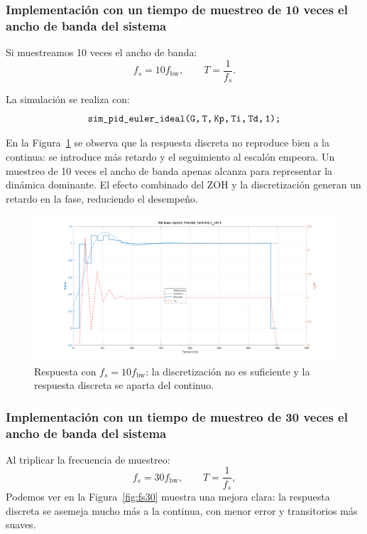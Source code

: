 \twocolumn
\subsubsection{ Implementación con un tiempo de muestreo de 10 veces el ancho de banda del sistema
}


Si muestreamos 10 veces el ancho de banda:
\[
f_s = 10 f_{\mathrm{bw}}, \qquad T = \frac{1}{f_s}.
\]

La simulación se realiza con:
\[
\texttt{sim\_pid\_euler\_ideal(G,\,T,\,Kp,\,Ti,\,Td,\,1);}
\]

En la Figura~\ref{fig:fs10} se observa que la respuesta discreta no reproduce bien a la continua: se introduce más retardo y el seguimiento al escalón empeora.
Un muestreo de 10 veces el ancho de banda apenas alcanza para representar la dinámica dominante. El efecto combinado del ZOH y la discretización generan un retardo en la fase, reduciendo el desempeño.  

\begin{figure}[!t]
	\centering
	\includegraphics[width=\columnwidth]{img/fs10.png}
	\caption{Respuesta con $f_s=10 f_{\mathrm{bw}}$: la discretización no es suficiente y la respuesta discreta se aparta del continuo.}
	\label{fig:fs10}
\end{figure}



\subsubsection{ Implementación con un tiempo de muestreo de 30 veces el ancho de banda del sistema
}

Al triplicar la frecuencia de muestreo:
\[
f_s = 30 f_{\mathrm{bw}}, \qquad T = \frac{1}{f_s},
\]
Podemos ver en la Figura~\ref{fig:fs30} muestra una mejora clara: la respuesta discreta se asemeja mucho más a la continua, con menor error y transitorios más suaves.

